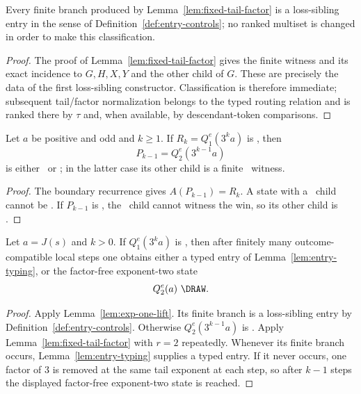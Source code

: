 \begin{lemma}\label{lem:entry-typing}
Every finite branch produced by Lemma~\ref{lem:fixed-tail-factor} is a
loss-sibling entry in the sense of Definition~\ref{def:entry-controls}; no
ranked multiset is changed in order to make this classification.
\end{lemma}

\begin{proof}
The proof of Lemma~\ref{lem:fixed-tail-factor} gives the finite witness and
its exact incidence to $G,H,X,Y$ and the other child of $G$. These are
precisely the data of the first loss-sibling constructor. Classification is
therefore immediate; subsequent tail/factor normalization belongs to the
typed routing relation and is ranked there by $\tau$ and, when available,
by descendant-token comparisons.
\end{proof}

\begin{lemma}\label{lem:exp-one-lift}
Let $a$ be positive and odd and $k\ge1$. If
$R_k=Q_1^e(3^ka)$ is \DRAW, then
\[
  P_{k-1}=Q_2^e(3^{k-1}a)
\]
is either \DRAW\ or \WIN; in the latter case its other child is a finite
\LOSS\ witness.
\end{lemma}

\begin{proof}
The boundary recurrence gives $A(P_{k-1})=R_k$. A state with a \DRAW\ child
cannot be \LOSS. If $P_{k-1}$ is \WIN, the \DRAW\ child cannot witness the
win, so its other child is \LOSS.
\end{proof}

\begin{proposition}\label{prop:factorful-entry}
Let $a=J(s)$ and $k>0$. If $Q_1^e(3^ka)$ is \DRAW, then after finitely many
outcome-compatible local steps one obtains either a typed entry of
Lemma~\ref{lem:entry-typing}, or the factor-free exponent-two state
\[
  Q_2^e(a)\text{ \DRAW}.
\]
\end{proposition}

\begin{proof}
Apply Lemma~\ref{lem:exp-one-lift}. Its finite branch is a loss-sibling entry by Definition~\ref{def:entry-controls}. Otherwise $Q_2^e(3^{k-1}a)$ is \DRAW. Apply
Lemma~\ref{lem:fixed-tail-factor} with $r=2$ repeatedly. Whenever its finite
branch occurs, Lemma~\ref{lem:entry-typing} supplies a typed entry. If it never
occurs, one factor of $3$ is removed at the same tail exponent at each step,
so after $k-1$ steps the displayed factor-free exponent-two state is reached.
\end{proof}

